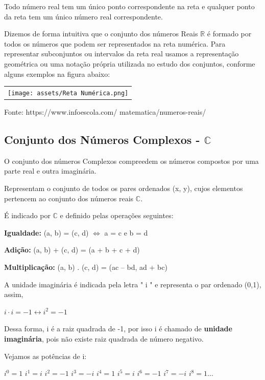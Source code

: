 \begin{multicols*}{2}
    Todo número real tem um único ponto correspondente na reta e qualquer ponto da reta tem um único número real correspondente.

    Dizemos de forma intuitiva que o conjunto dos números Reais $\mathbb{R}$ é formado por todos os números que podem ser representados na reta numérica. Para representar subconjuntos ou intervalos da reta real usamos a representação geométrica ou uma notação própria utilizada no estudo dos conjuntos, conforme alguns exemplos na figura abaixo:

    \begin{tabular}{@{}c@{}}
        \texttt{[image: assets/Reta Numérica.png]}
    \end{tabular}

    Fonte: 	https://www.infoescola.com/
    matematica/numeros-reais/\\

    \subsection{Conjunto dos Números Complexos - $\mathbb{C}$}

    O conjunto dos números Complexos compreedem os números compostos por uma parte real e outra imaginária.

    Representam o conjunto de todos os pares ordenados (x, y), cujos elementos pertencem ao conjunto dos números reais $\mathbb{C}$.

    É indicado por $\mathbb{C}$ e definido pelas operações seguintes:

    \textbf{Igualdade:} (a, b) = (c, d) $\Longleftrightarrow$ a = c e b = d

    \textbf{Adição:} (a, b) + (c, d) = (a + b + c + d)

    \textbf{Multiplicação:} (a, b) . (c, d) = (ac – bd, ad + bc)

    A unidade imaginária é indicada pela letra " i " e representa o par ordenado (0,1), assim,

    $i \cdot i = -1 \leftrightarrow i^2 = -1$

    Dessa forma, i é a raiz quadrada de -1, por isso i é chamado de \textbf{unidade imaginária}, pois não existe raiz quadrada de número negativo.

    Vejamos as potências de i:

    $ i^0 = 1$
    $ i^1 = i $
    $ i^2 = -1$
    $ i^3 = -i $
    $ i^4 = 1$
    $ i^5 = i$
    $ i^6 = -1$
    $ i^7 = -i$
    $ i^8 = 1 \dots$


\end{multicols*}
